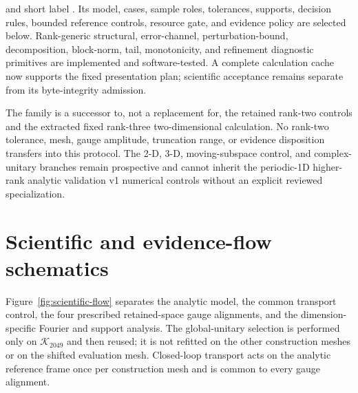 \documentclass[11pt]{article}
\begin{document}
and short label . Its model, cases, sample roles, tolerances,
supports, decision rules, bounded reference controls, resource gate, and evidence policy
are selected below. Rank-generic structural, error-channel, perturbation-bound,
decomposition, block-norm, tail, monotonicity, and refinement diagnostic primitives are
implemented and software-tested. A complete calculation cache now supports the fixed
presentation plan; scientific acceptance remains separate from its byte-integrity
admission.

The family is a successor to, not a replacement for, the retained rank-two controls and
the extracted fixed rank-three two-dimensional calculation. No rank-two tolerance, mesh,
gauge amplitude, truncation range, or evidence disposition transfers into this protocol.
The 2-D, 3-D, moving-subspace control, and complex-unitary branches remain prospective and cannot inherit the periodic-1D higher-rank analytic validation v1
numerical controls without an explicit reviewed specialization.

\section{Scientific and evidence-flow schematics}

Figure~\ref{fig:scientific-flow} separates the analytic model, the common transport
control, the four prescribed retained-space gauge alignments, and the dimension-specific
Fourier and support analysis. The global-unitary selection is performed only on
$\mathcal K_{2049}$ and then reused; it is not refitted on the other construction meshes
or on the shifted evaluation mesh. Closed-loop transport acts on the analytic reference
frame once per construction mesh and is common to every gauge alignment.
\end{document}
